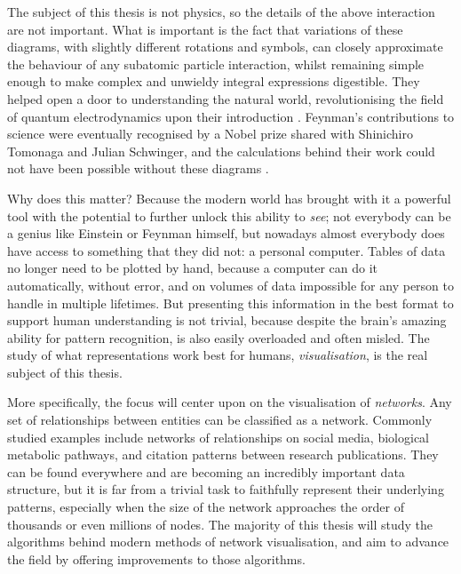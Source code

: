 The subject of this thesis is not physics, so the details of the above interaction are not important. What is important is the fact that variations of these diagrams, with slightly different rotations and symbols, can closely approximate the behaviour of any subatomic particle interaction, whilst remaining simple enough to make complex and unwieldy integral expressions digestible. They helped open a door to understanding the natural world, revolutionising the field of quantum electrodynamics upon their introduction \cite{Kaiser2005}.
Feynman's contributions to science were eventually recognised by a Nobel prize shared with Shinichiro Tomonaga and Julian Schwinger, and the calculations behind their work could not have been possible without these diagrams \cite{Kaiser2009}.

Why does this matter? Because the modern world has brought with it a powerful tool with the potential to further unlock this ability to \emph{see};
not everybody can be a genius like Einstein or Feynman himself, but nowadays almost everybody does have access to something that they did not: a personal computer.
Tables of data no longer need to be plotted by hand, because a computer can do it automatically, without error, and on volumes of data impossible for any person to handle in multiple lifetimes.
But presenting this information in the best format to support human understanding is not trivial, because despite the brain's amazing ability for pattern recognition, is also easily overloaded and often misled.
The study of what representations work best for humans, \emph{visualisation}, is the real subject of this thesis.

More specifically, the focus will center upon on the visualisation of \emph{networks}. 
Any set of relationships between entities can be classified as a network. Commonly studied examples include networks of relationships on social media, biological metabolic pathways, and citation patterns between research publications. They can be found everywhere and are becoming an incredibly important data structure, but it is far from a trivial task to faithfully represent their underlying patterns, especially when the size of the network approaches the order of thousands or even millions of nodes. The majority of this thesis will study the algorithms behind modern methods of network visualisation, and aim to advance the field by offering improvements to those algorithms.

